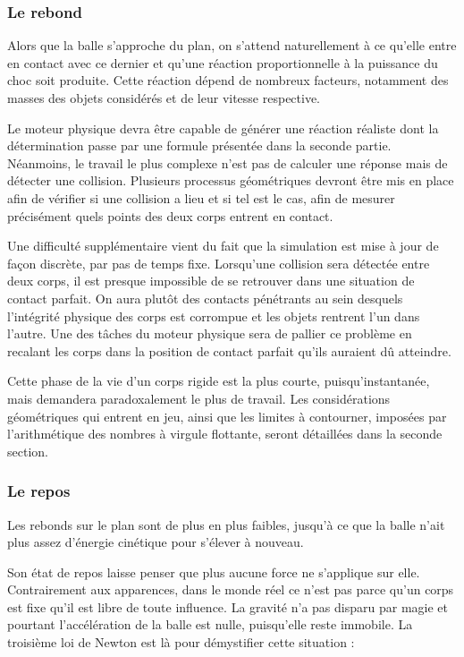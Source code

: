 \subsubsection{Le rebond}

Alors que la balle s'approche du plan, on s'attend naturellement à ce
qu'elle entre en contact avec ce dernier et qu'une réaction
proportionnelle à la puissance du choc soit produite. Cette réaction
dépend de nombreux facteurs, notamment des masses des objets
considérés et de leur vitesse respective.

Le moteur physique devra être capable de générer une réaction réaliste
dont la détermination passe par une formule présentée dans la seconde
partie. Néanmoins, le travail le plus complexe n'est pas de calculer
une réponse mais de détecter une collision. Plusieurs processus
géométriques devront être mis en place afin de vérifier si une
collision a lieu et si tel est le cas, afin de mesurer précisément
quels points des deux corps entrent en contact.

Une difficulté supplémentaire vient du fait que la simulation est mise
à jour de façon discrète, par pas de temps fixe. Lorsqu'une collision
sera détectée entre deux corps, il est presque impossible de se
retrouver dans une situation de contact parfait. On aura plutôt des
contacts pénétrants au sein desquels l'intégrité physique des corps
est corrompue et les objets rentrent l'un dans l'autre. Une des tâches
du moteur physique sera de pallier ce problème en recalant les corps
dans la position de contact parfait qu'ils auraient dû atteindre.

Cette phase de la vie d'un corps rigide est la plus courte,
puisqu'instantanée, mais demandera paradoxalement le plus de
travail. Les considérations géométriques qui entrent en jeu, ainsi que
les limites à contourner, imposées par l'arithmétique des nombres à
virgule flottante, seront détaillées dans la seconde section.

\subsubsection{Le repos}

Les rebonds sur le plan sont de plus en plus faibles, jusqu'à ce que
la balle n'ait plus assez d'énergie cinétique pour s'élever à
nouveau.

Son état de repos laisse penser que plus aucune force ne s'applique
sur elle. Contrairement aux apparences, dans le monde réel ce n'est
pas parce qu'un corps est fixe qu'il est libre de toute influence. La
gravité n'a pas disparu par magie et pourtant l'accélération de la
balle est nulle, puisqu'elle reste immobile. La troisième loi de
Newton \cite{newton} est là pour démystifier cette situation :

